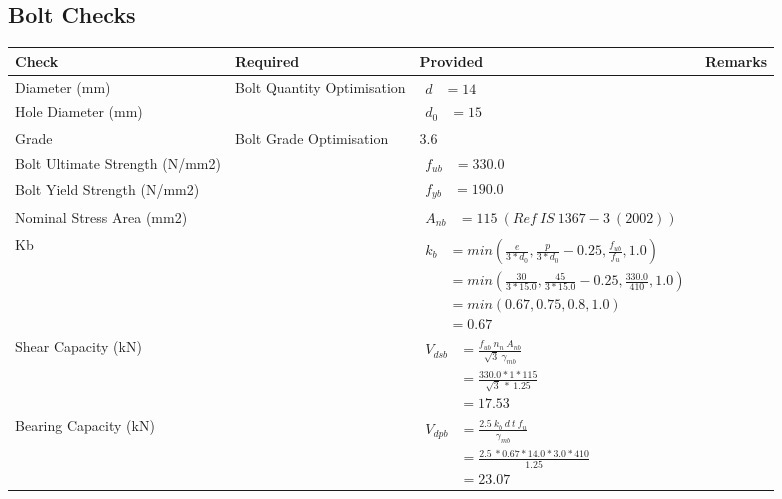 \documentclass{article}%
\begin{document}
\subsection{Bolt Checks}%
\label{subsec:BoltChecks}%
\renewcommand{\arraystretch}{1.2}%
\begin{longtable}{|p{2.5cm}|p{5.5cm}|p{7cm}|p{1cm}|}%
\hline%
\rowcolor{OsdagGreen}%
Check&Required&Provided&Remarks\\%
\hline%
\endhead%
\hline%
Diameter (mm)&Bolt Quantity Optimisation&$\begin{aligned} d &=14\end{aligned}$&\\%
\hline%
Hole Diameter (mm)& &$\begin{aligned} d_0 &=15\end{aligned}$&\\%
\hline%
Grade&Bolt Grade Optimisation&3.6&\\%
\hline%
Bolt Ultimate Strength (N/mm2)&&$\begin{aligned} f_{ub} &=330.0\end{aligned}$&\\%
\hline%
Bolt Yield Strength (N/mm2)&&$\begin{aligned} f_{yb} &=190.0\end{aligned}$&\\%
\hline%
Nominal Stress Area (mm2)& &$\begin{aligned} A_{nb} &=115~( Ref~IS~1367-3~(2002))\end{aligned}$&\\%
\hline%
Kb& &$\begin{aligned} k_b & = min(\frac{e}{3*d_0},\frac{p}{3*d_0}-0.25,\frac{f_{ub}}{f_u},1.0)\\ & = min(\frac{30}{3*15.0},\frac{45}{3*15.0}-0.25,\frac{330.0}{410},1.0)\\ & = min(0.67,0.75,0.8,1.0)\\ & = 0.67\end{aligned}$&\\%
\hline%
Shear Capacity (kN)&&$\begin{aligned}V_{dsb} &= \frac{f_{ub} ~n_n~ A_{nb}}{\sqrt{3} ~\gamma_{mb}}\\ &= \frac{330.0*1*115}{\sqrt{3}~*~1.25}\\ &= 17.53\end{aligned}$&\\%
\hline%
Bearing Capacity (kN)&&$\begin{aligned}V_{dpb} &= \frac{2.5~ k_b~ d~ t~ f_u}{\gamma_{mb}}\\ &= \frac{2.5~*0.67*14.0*3.0*410}{1.25}\\ &=23.07\end{aligned}$&\\%

\end{longtable}
\end{document}
